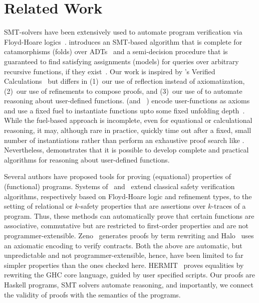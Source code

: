 \section{Related Work}\label{sec:related}


%
SMT-solvers have been extensively
used to automate program verification
via Floyd-Hoare logics~\cite{Nelson81}.
%
 introduces an
SMT-based algorithm that is
complete for catamorphisms
(folds) over ADTs~\cite{Suter2010}
and a semi-decision procedure that 
is guaranteed to find satisfying assignments 
(models) for queries over arbitrary recursive
functions, if they exist~\cite{Suter2011}.
%
Our work is inspired by \dafny's Verified
Calculations~\citep{LeinoPolikarpova16} 
but differs in
%
(1)~our use of reflection instead of axiomatization,
%
(2)~our use of refinements to compose proofs, and
%
(3)~our use of \pbesym to automate reasoning
about user-defined functions.
%
\dafny (and \fstar~\citep{fstar})
encode user-functions as axioms and use
a fixed fuel to instantiate functions
upto some fixed unfolding
depth~\cite{Amin2014ComputingWA}.
%
While the fuel-based approach is incomplete,
even for equational or calculational reasoning,
it may, although rare in practice, quickly
time out after a fixed, small number of
instantiations rather than perform an
exhaustive proof search like \pbesym.
%
Nevertheless, \pbesym demonstrates that it
is possible to develop complete and practical
algorithms for reasoning about user-defined
functions.

%
Several authors have proposed tools for proving
(equational) properties of (functional) programs.
%
Systems of~\citet{sousa16} and~\citet{KobayashiRelational15}
extend classical safety verification algorithms,
respectively based on Floyd-Hoare logic and refinement types,
to the setting of relational or $k$-safety properties
that are assertions over $k$-traces of a program.
%
Thus, these methods can automatically prove that
certain functions are associative, commutative \etc
but are restricted to first-order properties and
are not programmer-extensible.
%
Zeno~\citep{ZENO} generates proofs by term
rewriting and Halo~\citep{HALO} uses an axiomatic
encoding to verify contracts.
%
Both the above are automatic, but unpredictable and not
programmer-extensible, hence, have been limited to
far simpler properties than the ones checked here.
%
HERMIT~\citep{Farmer15} proves equalities by rewriting
the GHC core language, guided by user specified scripts.
%
Our proofs are Haskell programs, SMT solvers
automate reasoning, and importantly, we
connect the validity of proofs with the
semantics of the programs.


